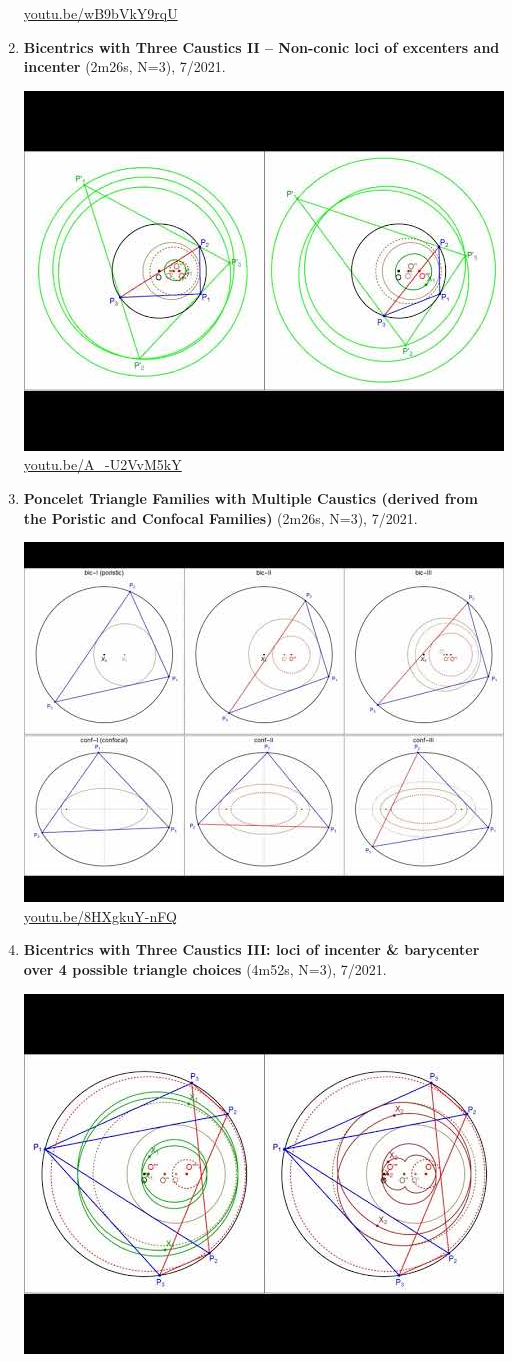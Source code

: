 \documentclass[12pt]{amsart}
\begin{document}
\begin{enumerate}[resume]
\begin{center}
\href{https://youtu.be/wB9bVkY9rqU}{\url{youtu.be/wB9bVkY9rqU}}\end{center}
% 
\item \textbf{Bicentrics with Three Caustics II -- Non-conic loci of excenters and  incenter} (2m26s, N=3), 7/2021. 
\begin{center}\includegraphics[width=.5\textwidth]{pics/A_-U2VvM5kY.jpg} \\ 
\href{https://youtu.be/A_-U2VvM5kY}{\url{youtu.be/A\_-U2VvM5kY}}\end{center}
% 
\item \textbf{Poncelet Triangle Families with Multiple Caustics (derived from the Poristic and Confocal Families)} (2m26s, N=3), 7/2021. 
\begin{center}\includegraphics[width=.5\textwidth]{pics/8HXgkuY-nFQ.jpg} \\ 
\href{https://youtu.be/8HXgkuY-nFQ}{\url{youtu.be/8HXgkuY-nFQ}}\end{center}
% 
\item \textbf{Bicentrics with Three Caustics III: loci of incenter \& barycenter over 4 possible triangle choices} (4m52s, N=3), 7/2021. 
\begin{center}\includegraphics[width=.5\textwidth]{pics/E1Rcu38MePQ.jpg} \\ 

\end{center}
\end{enumerate}
\end{document}
